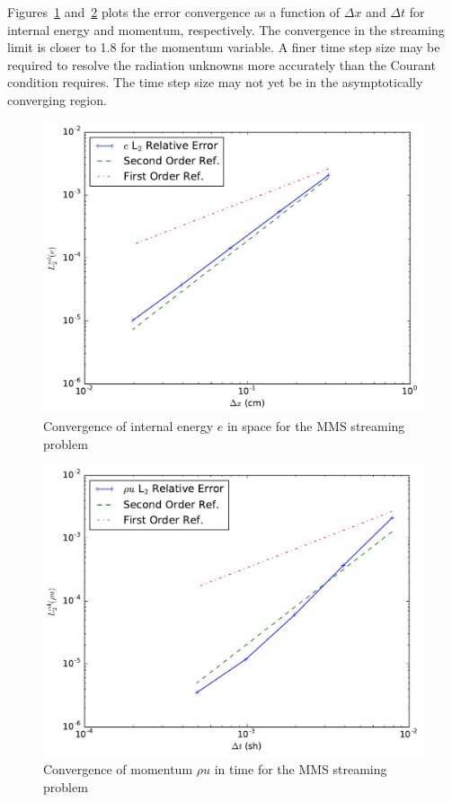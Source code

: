 \documentclass[preprint,12pt]{elsarticle}
\begin{document}
Figures~\ref{fig:streaming_e} and~\ref{fig:streaming_mom} plots the error convergence as a function of $\Delta x$ and $\Delta t$ for
internal energy and momentum, respectively.  
The convergence in the streaming
limit is closer to 1.8 for the momentum variable. A finer time step size may be required to resolve the radiation unknowns more accurately than the
Courant condition requires. The time step size may not yet be in the asymptotically converging region.

\begin{figure}[ht]
   \centering
   \includegraphics[width=\textwidth]{figures/MMS_streaming_e_convergence.pdf}
   \caption{\label{fig:streaming_e}Convergence of internal energy $e$ in space for the MMS streaming problem}
\end{figure}
\begin{figure}[ht]
   \centering
   \includegraphics[width=\textwidth]{figures/MMS_streaming_rhou_convergence.pdf}
   \caption{\label{fig:streaming_mom}Convergence of momentum $\rho u$ in time for the MMS streaming problem}
\end{figure}
\end{document}
